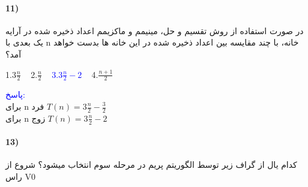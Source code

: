 \documentclass[10pt,a4paper]{article}
\begin{document}
	\paragraph{11)} در صورت استفاده از روش تقسیم و حل، مینیمم و ماکزیمم اعداد ذخیره شده در آرایه یک بعدی با n خانه، با چند مقایسه بین اعداد ذخیره شده در این خانه ها بدست خواهد آمد؟
	\begin{flushright} 
		1.$3\frac{n}{2}$\,\,\,\,\, 2.$\frac{n}{2}$\,\,\,\,\, \textcolor{blue}{3.$3\frac{n}{2}-2$}\,\,\,\,\, 4.$\frac{n+1}{2}$
	\end{flushright}
	\begin{flushright} 
		\textcolor{blue}{پاسخ:}
		\\ برای n فرد $T(n) = 3\frac{n}{2}-\frac{3}{2}$ \\
		برای n زوج $T(n) = 3\frac{n}{2}-2$
	\end{flushright}

	\paragraph{13)} کدام یال از گراف زیر توسط الگوریتم پریم در مرحله سوم انتخاب میشود؟ شروع از راس V0
\end{document}
